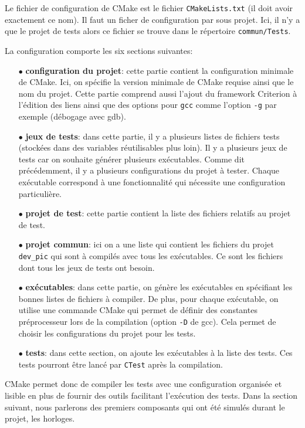 \documentclass[a4paper]{article}
\begin{document}
Le fichier de configuration de CMake est le fichier \verb|CMakeLists.txt|
(il doit avoir exactement ce nom). Il faut un ficher de configuration par sous
projet. Ici, il n'y a que le projet de tests alors ce fichier se trouve dans le
répertoire \verb|commun/Tests|.

La configuration comporte les six sections suivantes:

\begin{itemize}
  \item[$\bullet$] \textbf{configuration du projet}: cette partie contient la
    configuration minimale de CMake. Ici, on spécifie la version minimale de
    CMake requise ainsi que le nom du projet. Cette partie comprend aussi
    l'ajout du framework Criterion à l'édition des liens ainsi que des options
    pour \verb|gcc| comme l'option \verb|-g| par exemple (débogage
    avec gdb).
  \item[$\bullet$] \textbf{jeux de tests}: dans cette partie, il y a plusieurs
    listes de fichiers tests (stockées dans des variables réutilisables plus
    loin). Il y a plusieurs jeux de tests car on souhaite générer plusieurs
    exécutables. Comme dit précédemment, il y a plusieurs configurations du
    projet à tester. Chaque exécutable correspond à une fonctionnalité qui
    nécessite une configuration particulière.
  \item[$\bullet$] \textbf{projet de test}: cette partie contient la liste des
    fichiers relatifs au projet de test.
  \item[$\bullet$] \textbf{projet commun}: ici on a une liste qui contient les
    fichiers du projet \verb|dev_pic| qui sont à compilés avec tous les
    exécutables. Ce sont les fichiers dont tous les jeux de tests ont besoin.
  \item[$\bullet$] \textbf{exécutables}: dans cette partie, on génère les
    exécutables en spécifiant les bonnes listes de fichiers à compiler. De plus,
    pour chaque exécutable, on utilise une commande CMake qui permet de définir
    des constantes préprocesseur lors de la compilation (option \verb|-D|
    de gcc). Cela permet de choisir les configurations du projet pour les tests.
  \item[$\bullet$] \textbf{tests}: dans cette section, on ajoute les exécutables
    à la liste des tests. Ces tests pourront être lancé par \verb|CTest|
    après la compilation.
\end{itemize}

CMake permet donc de compiler les tests avec une configuration organisée et
lisible en plus de fournir des outils facilitant l'exécution des tests. Dans la
section suivant, nous parlerons des premiers composants qui ont été simulés
durant le projet, les horloges.
\end{document}
